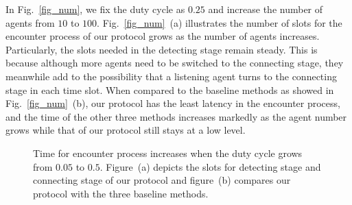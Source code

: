 In Fig.~\ref{fig_num}, we fix the duty cycle as $0.25$ and 
increase the number of agents from $10$ to $100$.
Fig.~\ref{fig_num}~(a) illustrates
the number of slots for the encounter process 
of our protocol grows as the number of agents increases. Particularly,
the slots needed in the detecting stage remain steady.
This is because although more agents need to be switched to the connecting stage,
they meanwhile add to the possibility
that a listening agent turns to the connecting stage in each time slot.
When compared to the baseline methods as showed in
Fig.~\ref{fig_num}~(b), our protocol has the least latency in
the encounter process, and the time of the other three methods increases
markedly as the agent number grows while that of our protocol still
stays at a low level.

\begin{figure}[!h]
    \centering
    \hspace{0.01in}
    \caption{Time for encounter process increases when the duty cycle grows from $0.05$ to $0.5$.
    Figure~(a) depicts the slots for detecting stage and connecting stage of our protocol and figure~(b)
    compares our protocol with the three baseline methods.}
    \label{fig_DC}
\end{figure}

